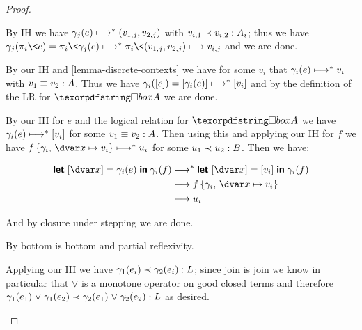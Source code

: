 \begin{proof}
\begin{description}[ topsep=\baselineskip, itemsep=\baselineskip, ]
  \item[Case\quad $\infer{\J e \G {A_1 \x A_2}}{\J{\pi_i\<e}\G{A_i}}$.] By IH we have \(\gamma_j(e) \evalsto \etuple{v_{1,j}, v_{2,j}}\) with \(\oplrvalue{A_i}{v_{i,1}}{v_{i,2}}\); thus we have \(\gamma_j(\pi_i\<e) = \pi_i\<\gamma_j(e) \evalsto \pi_i\<\etuple{v_{1,j}, v_{2,j}} \stepsto v_{i,j}\) and we are done.

  \item[Case\quad $\infer{\J e \G A_i}{\J{\inj i e}\G{A_1 + A_2}}$.]
    \XXX

  \item[Case\quad $\infer{\J e \G {A_1 + A_2} \\
      (\J {f_i} {\G,\, \hm{x_i}{A_i}} {B})_i
    }{
      \J {\emcase{e} (\inj i {\mvar x_i} \caseto f_i)_i} \G B
    }$.]
    \XXX

  \item[Case\quad $\infer{\J {e} {\stripcx\G} A}{\J{\ebox e} \G {\iso A}}$.]
    By our IH and \cref{lemma-discrete-contexts} we have for some $v_i$ that \(\gamma_i(e) \evalsto v_i\) with \(\oplrvalueequiv A {v_1}{v_2}\). Thus we have \(\gamma_i(\eboxraw{e}) = \eboxraw{\gamma_i(e)} \evalsto \eboxraw{v_i}\) and by the definition of the LR for \(\iso A\) we are done.

  \item[Case\quad $\infer{\J e \G {\iso A} \\ \J f {\G,\,\hd x A} B}{
    \J {\eletbox x e f} \G B}$.]
    By our IH for $e$ and the logical relation for \(\iso A\) we have \(\gamma_i(e) \evalsto \eboxraw{v_i}\) for some \(\oplrvalueequiv A {v_1}{v_2}\). Then using this and applying our IH for $f$ we have \(\sub{f}{\gamma_i,\, \subto{\dvar x}{v_i}} \evalsto u_i\) for some \(\oplrvalue B {u_1}{u_2}\). Then we have:

    \begin{align*}
      \eletbox x {\gamma_i(e)} \gamma_i(f)
      &\evalsto \eletbox x {\eboxraw{v_i}} \gamma_i(f)\\
      &\stepsto \sub{f}{\gamma_i,\, \subto{\dvar x}{v_i}}\\
      &\stepsto u_i
    \end{align*}

    \noindent
    And by closure under stepping we are done.

  \item[Case\quad $\infer{\quad}{\J\bot\G {L}}$.] By bottom is bottom and partial reflexivity.

  \item[Case\quad $\infer{(\J{e_i} \G {L})_i}{\J{e_1 \vee e_2}\G {L}}$.] Applying our IH we have \(\oplrclosed L {\gamma_1(e_i)} {\gamma_2(e_i)}\); since \hyperref[lemma-join-is-join]{join is join} we know in particular that \(\vee\) is a monotone operator on good closed terms and therefore \(\oplrclosed L {\gamma_1(e_1) \vee \gamma_1(e_2)} {\gamma_2(e_1) \vee \gamma_2(e_2)}\) as desired.


\end{description}
\end{proof}
